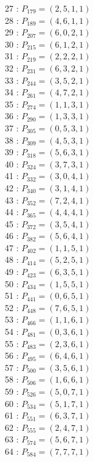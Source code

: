 \documentclass{article}
\begin{document}
{\begin{multicols}{3}
27 : $P_{179}=( 2, 5, 1, 1 )$\\
28 : $P_{189}=( 4, 6, 1, 1 )$\\
29 : $P_{207}=( 6, 0, 2, 1 )$\\
30 : $P_{215}=( 6, 1, 2, 1 )$\\
31 : $P_{219}=( 2, 2, 2, 1 )$\\
32 : $P_{231}=( 6, 3, 2, 1 )$\\
33 : $P_{244}=( 3, 5, 2, 1 )$\\
34 : $P_{261}=( 4, 7, 2, 1 )$\\
35 : $P_{274}=( 1, 1, 3, 1 )$\\
36 : $P_{290}=( 1, 3, 3, 1 )$\\
37 : $P_{305}=( 0, 5, 3, 1 )$\\
38 : $P_{309}=( 4, 5, 3, 1 )$\\
39 : $P_{318}=( 5, 6, 3, 1 )$\\
40 : $P_{324}=( 3, 7, 3, 1 )$\\
41 : $P_{332}=( 3, 0, 4, 1 )$\\
42 : $P_{340}=( 3, 1, 4, 1 )$\\
43 : $P_{352}=( 7, 2, 4, 1 )$\\
44 : $P_{365}=( 4, 4, 4, 1 )$\\
45 : $P_{372}=( 3, 5, 4, 1 )$\\
46 : $P_{382}=( 5, 6, 4, 1 )$\\
47 : $P_{402}=( 1, 1, 5, 1 )$\\
48 : $P_{414}=( 5, 2, 5, 1 )$\\
49 : $P_{423}=( 6, 3, 5, 1 )$\\
50 : $P_{434}=( 1, 5, 5, 1 )$\\
51 : $P_{441}=( 0, 6, 5, 1 )$\\
52 : $P_{448}=( 7, 6, 5, 1 )$\\
53 : $P_{466}=( 1, 1, 6, 1 )$\\
54 : $P_{481}=( 0, 3, 6, 1 )$\\
55 : $P_{483}=( 2, 3, 6, 1 )$\\
56 : $P_{495}=( 6, 4, 6, 1 )$\\
57 : $P_{500}=( 3, 5, 6, 1 )$\\
58 : $P_{506}=( 1, 6, 6, 1 )$\\
59 : $P_{526}=( 5, 0, 7, 1 )$\\
60 : $P_{534}=( 5, 1, 7, 1 )$\\
61 : $P_{551}=( 6, 3, 7, 1 )$\\
62 : $P_{555}=( 2, 4, 7, 1 )$\\
63 : $P_{574}=( 5, 6, 7, 1 )$\\
64 : $P_{584}=( 7, 7, 7, 1 )$\\
\end{multicols}


}
\end{document}
